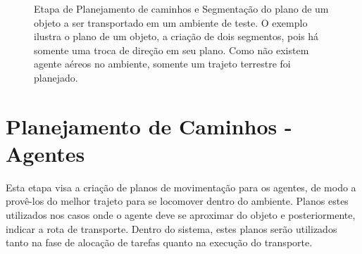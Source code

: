 \begin{figure}[ht!]
  \centering
  \setlength{\fboxsep}{0pt}
  \caption[Planejamento e Segmentação do plano de movimentação de um objeto]{Etapa de Planejamento de caminhos e Segmentação do plano de um objeto a ser transportado em um ambiente de teste. O exemplo ilustra o plano de um objeto, a criação de dois segmentos, pois há somente uma troca de direção em seu plano. Como não existem agente aéreos no ambiente, somente um trajeto terrestre foi planejado.}
  \label{fig:object_plan}
\end{figure}


\section{Planejamento de Caminhos - Agentes} %
\label{sub:planejamento_de_caminhos_agentes}

Esta etapa visa a criação de planos de movimentação para os agentes, de modo a provê-los do melhor trajeto para se locomover dentro do ambiente.
Planos estes utilizados nos casos onde o agente deve se aproximar do objeto e posteriormente, indicar a rota de transporte.
Dentro do sistema, estes planos serão utilizados tanto na fase de alocação de tarefas quanto na execução do transporte.

